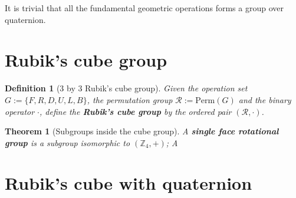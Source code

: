 \documentclass[12pt]{article}
\newtheorem*{definition}{Definition}
\newtheorem*{theorem}{Theorem}
\begin{document}
    It is trivial that all the fundamental geometric operations forms a group over quaternion.

    \section{Rubik's cube group}

    \begin{definition}[3 by 3 Rubik's cube group]
        Given the operation set $G:=\{F,R,D,U,L,B\}$, the permutation group $\mathcal{R}:=\mathrm{Perm}(G)$ and the binary operator $\cdot$, define the \textbf{Rubik's cube group} by the ordered pair $(\mathcal{R},\cdot)$. 
    \end{definition}

    \begin{theorem}[Subgroups inside the cube group]
        A \textbf{single face rotational group} is a subgroup isomorphic to $(\mathbb{Z}_4,+)$; A
    \end{theorem}

    \section{Rubik's cube with quaternion}
\end{document}
